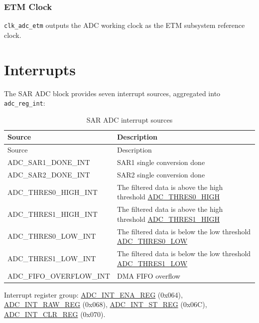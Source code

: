 \documentclass[main\_\_EN.tex]{subfiles}
\begin{document}
\subsubsection{ETM Clock}
\verb+clk_adc_etm+ outputs the ADC working clock as the ETM subsystem reference clock.


\section{Interrupts}
\label{sec:adc-intr}

The SAR ADC block provides seven interrupt sources, aggregated into \verb+adc_reg_int+:

\begin{longtable}[c]{|l|L{9 cm}|}
    \caption{SAR ADC interrupt sources}\label{tab:adc-intr}\\\hline
    Source & Description \\\hline
    \endfirsthead
    \hline
        Source & Description\\\hline
    \endhead
    \endfoot

    \label{interreupt:ADCSAR1DONEINT}ADC\_SAR1\_DONE\_INT     & SAR1 single conversion done \\\hline
    \label{interreupt:ADCSAR2DONEINT}ADC\_SAR2\_DONE\_INT     & SAR2 single conversion done \\\hline
    \label{interreupt:ADCTHRES0HIGHINT}ADC\_THRES0\_HIGH\_INT   & The filtered data is above the high threshold \hyperref[fielddesc:ADCTHRES0HIGH]{ADC\_THRES0\_HIGH} \\\hline
    \label{interreupt:ADCTHRES1HIGHINT}ADC\_THRES1\_HIGH\_INT   & The filtered data is above the high threshold \hyperref[fielddesc:ADCTHRES1HIGH]{ADC\_THRES1\_HIGH} \\\hline
    \label{interreupt:ADCTHRES0LOWINT}ADC\_THRES0\_LOW\_INT    & The filtered data is below the low threshold \hyperref[fielddesc:ADCTHRES0LOW]{ADC\_THRES0\_LOW} \\\hline
    \label{interreupt:ADCTHRES1LOWINT}ADC\_THRES1\_LOW\_INT    & The filtered data is below the low threshold \hyperref[fielddesc:ADCTHRES1LOW]{ADC\_THRES1\_LOW} \\\hline
    \label{interreupt:ADCFIFOOVERFLOWINT}ADC\_FIFO\_OVERFLOW\_INT & DMA FIFO overflow \\\hline

\end{longtable}

Interrupt register group: \hyperref[regdesc:ADCINTENAREG]{ADC\_INT\_ENA\_REG} (0x064), \hyperref[regdesc:ADCINTRAWREG]{ADC\_INT\_RAW\_REG} (0x068), \hyperref[regdesc:ADCINTSTREG]{ADC\_INT\_ST\_REG} (0x06C), \hyperref[regdesc:ADCINTCLRREG]{ADC\_INT\_CLR\_REG} (0x070).
\end{document}
